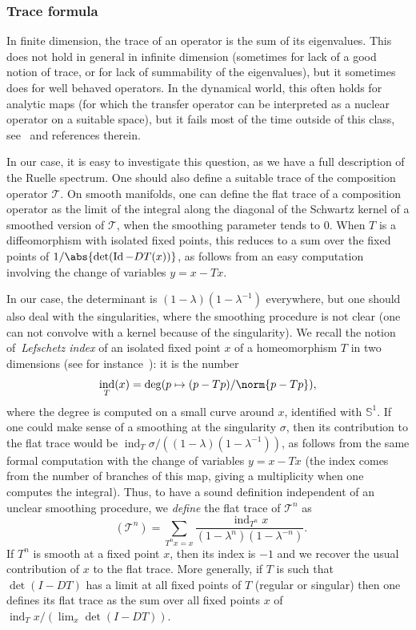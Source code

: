 \documentclass[JEP,XML,SOM,Unicode]{cedram}
\newcommand{\boT}{\mathcal{T}}
\newcommand{\Sbb}{\mathbb{S}}
\DeclareMathOperator{\ind}{ind}
\DeclareMathOperator{\Id}{Id}
\DeclareMathOperator{\flattr}{\mathrm{tr}^{\flat}}
\theoremstyle{definition}
\numberwithin{equation}{section}
\begin{document}
\subsubsection*{Trace formula}

In finite dimension, the trace of an operator is the sum of its eigenvalues.
This does not hold in general in infinite dimension (sometimes for lack of a
good notion of trace, or for lack of summability of the eigenvalues), but it
sometimes does for well behaved operators. In the dynamical world, this often
holds for analytic maps (for which the transfer operator can be interpreted
as a nuclear operator on a suitable space), but it fails most of the time
outside of this class, see~\cite{jezequel} and references therein.

In our case, it is easy to investigate this question, as we have a full
description of the Ruelle spectrum. One should also define a suitable trace
of the composition operator $\boT$. On smooth manifolds, one can define the
flat trace of a composition operator as the limit of the integral along the
diagonal of the Schwartz kernel of a smoothed version of $\boT$, when the
smoothing parameter tends to $0$. When $T$ is a diffeomorphism with isolated
fixed points, this reduces to a sum over the fixed points of
$1/{\abs{\det(\Id - DT(x))}}$, as follows from an easy computation involving
the change of variables $y = x - T x$.

In our case, the determinant is $(1-\lambda) (1-\lambda^{-1})$ everywhere,
but one should also deal with the singularities, where the smoothing
procedure is not clear (one can not convolve with a kernel because of the
singularity). We recall the notion of~\emph{Lefschetz index} of an isolated
fixed point $x$ of a homeomorphism $T$ in two dimensions (see for
instance~\cite[\S8.4]{katok}): it is the number
\begin{equation*}
\ind_T (x) = \deg (p \mapsto (p-T p)/\norm{p-T p}),
\end{equation*}
where the degree is computed on a small curve around $x$, identified with
$\Sbb^1$. If one could make sense of a smoothing at the singularity $\sigma$,
then its contribution to the flat trace would be $\ind_T \sigma/((1-\lambda)
(1-\lambda^{-1}))$, as follows from the same formal computation with the
change of variables $y = x- Tx$ (the index comes from the number of branches
of this map, giving a multiplicity when one computes the integral). Thus, to
have a sound definition independent of an unclear smoothing procedure, we
\emph{define} the flat trace of $\boT^n$ as
\begin{equation*}
\flattr(\boT^n) = \sum_{T^n x = x} \frac{ \ind_{T^n} x}{(1-\lambda^n) (1-\lambda^{-n})}.
\end{equation*}
If $T^n$ is smooth at a fixed point $x$, then its index is $-1$ and we
recover the usual contribution of $x$ to the flat trace. More generally, if
$T$ is such that $\det(I-DT)$ has a limit at all fixed points of $T$ (regular
or singular) then one defines its flat trace as the sum over all fixed points
$x$ of $\ind_T x/(\lim_x \det(I-DT))$.
\end{document}
